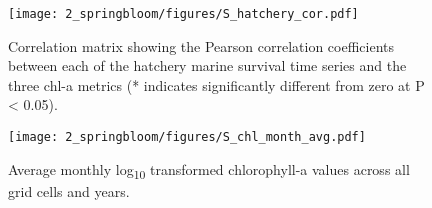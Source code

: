 \begin{figure}[htbp]
  \centering
  \texttt{[image: 2\_springbloom/figures/S\_hatchery\_cor.pdf]}
  \caption[Correlation matrix between each of the hatchery marine survival time
    series and the three chl-a metrics ]{Correlation matrix showing the Pearson
    correlation coefficients between each of the hatchery marine survival time
    series and the three chl-a metrics (* indicates significantly different from
    zero at P \textless{} 0.05).}
  \label{fig:bloom:s4}
\end{figure}

\begin{figure}[htbp]
  \centering
  \texttt{[image: 2\_springbloom/figures/S\_chl\_month\_avg.pdf]}
  \caption[Average monthly log\textsubscript{10} transformed chlorophyll-a
    values across all grid cells and years.]{Average monthly
    log\textsubscript{10} transformed chlorophyll-a values across all grid cells
    and years.}
  \label{fig:bloom:s5}
\end{figure}
